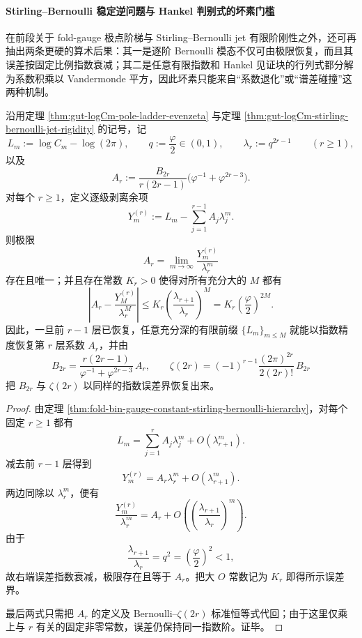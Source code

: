\paragraph{Stirling--Bernoulli 稳定逆问题与 Hankel 判别式的坏素门槛}
在前段关于 fold-gauge 极点阶梯与 Stirling--Bernoulli jet 有限阶刚性之外，还可再抽出两条更硬的算术后果：其一是逐阶 Bernoulli 模态不仅可由极限恢复，而且其误差按固定比例指数衰减；其二是任意有限指数和 Hankel 见证块的行列式都分解为系数积乘以 Vandermonde 平方，因此坏素只能来自“系数退化”或“谱差碰撞”这两种机制。

\begin{theorem}\label{thm:gut-logcm-stable-inverse-exponential-separation}
沿用定理 \ref{thm:gut-logCm-pole-ladder-evenzeta} 与定理 \ref{thm:gut-logCm-stirling-bernoulli-jet-rigidity} 的记号，记
\[
L_m:=\log C_m-\log(2\pi),
\qquad
q:=\frac{\varphi}{2}\in(0,1),
\qquad
\lambda_r:=q^{2r-1}
\qquad(r\ge 1),
\]
以及
\[
A_r:=\frac{B_{2r}}{r(2r-1)}\bigl(\varphi^{-1}+\varphi^{2r-3}\bigr).
\]
对每个 \(r\ge 1\)，定义逐级剥离余项
\[
Y_m^{(r)}:=L_m-\sum_{j=1}^{r-1}A_j\lambda_j^m.
\]
则极限
\[
A_r=\lim_{m\to\infty}\frac{Y_m^{(r)}}{\lambda_r^m}
\]
存在且唯一；并且存在常数 \(K_r>0\) 使得对所有充分大的 \(M\) 都有
\[
\left|
A_r-\frac{Y_M^{(r)}}{\lambda_r^M}
\right|
\le
K_r\left(\frac{\lambda_{r+1}}{\lambda_r}\right)^M
=
K_r\left(\frac{\varphi}{2}\right)^{2M}.
\]
因此，一旦前 \(r-1\) 层已恢复，任意充分深的有限前缀 \(\{L_m\}_{m\le M}\) 就能以指数精度恢复第 \(r\) 层系数 \(A_r\)，并由
\[
B_{2r}
=
\frac{r(2r-1)}{\varphi^{-1}+\varphi^{2r-3}}\,A_r,
\qquad
\zeta(2r)
=
(-1)^{r-1}\frac{(2\pi)^{2r}}{2(2r)!}\,B_{2r}
\]
把 \(B_{2r}\) 与 \(\zeta(2r)\) 以同样的指数误差界恢复出来。
\end{theorem}
\begin{proof}
由定理 \ref{thm:fold-bin-gauge-constant-stirling-bernoulli-hierarchy}，对每个固定 \(r\ge 1\) 都有
\[
L_m
=
\sum_{j=1}^{r}A_j\lambda_j^m+O(\lambda_{r+1}^m).
\]
减去前 \(r-1\) 层得到
\[
Y_m^{(r)}=A_r\lambda_r^m+O(\lambda_{r+1}^m).
\]
两边同除以 \(\lambda_r^m\)，便有
\[
\frac{Y_m^{(r)}}{\lambda_r^m}
=
A_r+O\!\left(\left(\frac{\lambda_{r+1}}{\lambda_r}\right)^m\right).
\]
由于
\[
\frac{\lambda_{r+1}}{\lambda_r}
=
q^2
=
\left(\frac{\varphi}{2}\right)^2
<1,
\]
故右端误差指数衰减，极限存在且等于 \(A_r\)。把大 \(O\) 常数记为 \(K_r\) 即得所示误差界。

最后两式只需把 \(A_r\) 的定义及 Bernoulli--\(\zeta(2r)\) 标准恒等式代回；由于这里仅乘上与 \(r\) 有关的固定非零常数，误差仍保持同一指数阶。证毕。
\end{proof}

